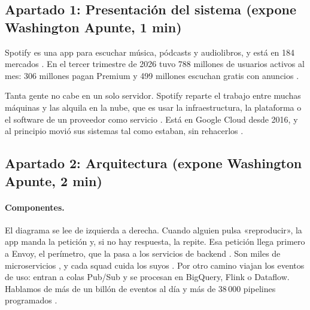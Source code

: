% 

\subsection*{Apartado 1: Presentación del sistema (expone Washington Apunte, 1 min)}

Spotify es una app para escuchar música, pódcasts y audiolibros, y está
en 184 mercados \cite{spotifyAbout2026}. En el tercer trimestre de 2026
tuvo 788 millones de usuarios activos al mes: 306 millones pagan Premium
y 499 millones escuchan gratis con anuncios \cite[p.~3]{spotifyQ32026}.

Tanta gente no cabe en un solo servidor. Spotify reparte el trabajo
entre muchas máquinas y las alquila en la nube, que es usar la
infraestructura, la plataforma o el software de un proveedor como
servicio \cite[p.~99]{vansteen2023ds}. Está en Google Cloud desde 2016,
y al principio movió sus sistemas tal como estaban, sin rehacerlos
\cite{strid2023fleet}.

\subsection*{Apartado 2: Arquitectura (expone Washington Apunte, 2 min)}

\paragraph{Componentes.}
El diagrama se lee de izquierda a derecha. Cuando alguien pulsa
«reproducir», la app manda la petición y, si no hay respuesta, la
repite. Esa petición llega primero a Envoy, el perímetro, que la pasa a
los servicios de backend \cite{spotifyIncident2025}. Son miles de
microservicios \cite{gustavsson2023fleet}, y cada squad cuida los suyos
\cite{strid2023fleet}. Por otro camino viajan los eventos de uso: entran
a colas Pub/Sub y se procesan en BigQuery, Flink o Dataflow. Hablamos de
más de un billón de eventos al día y más de 38\,000 pipelines
programados \cite{khlebnikova2024dataplatform}.

